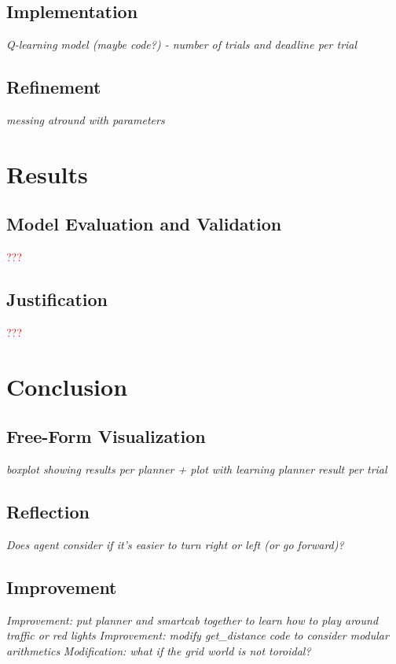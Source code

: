 \documentclass{article}
\begin{document}
\subsection{Implementation}
\textit{Q-learning model (maybe code?) - number of trials and deadline per trial}

\subsection{Refinement}
\textit{messing atround with parameters}

\section{Results}

\subsection{Model Evaluation and Validation}
\textcolor{red}{???}

\subsection{Justification}
\textcolor{red}{???}


\section{Conclusion}

\subsection{Free-Form Visualization}
\textit{boxplot showing results per planner + plot with learning planner result per trial}

\subsection{Reflection}
\textit{Does agent consider if it's easier to turn right or left (or go forward)?}

\subsection{Improvement}
\textit{Improvement: put planner and smartcab together to learn how to play around traffic or red lights}
\textit{Improvement: modify get\_distance code to consider modular arithmetics}
\textit{Modification: what if the grid world is not toroidal?}
\end{document}
